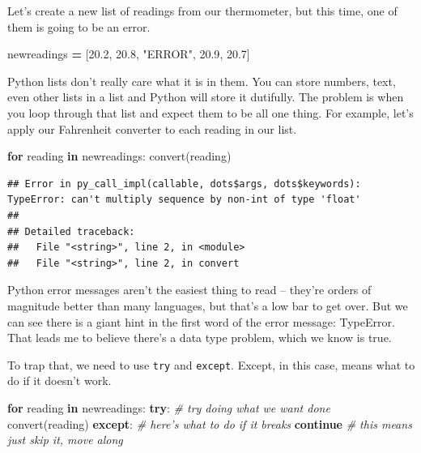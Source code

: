 \documentclass[
]{book}
\newenvironment{Shaded}{\begin{snugshade}}{\end{snugshade}}
\newcommand{\CommentTok}[1]{\textcolor[rgb]{0.56,0.35,0.01}{\textit{#1}}}
\newcommand{\ControlFlowTok}[1]{\textcolor[rgb]{0.13,0.29,0.53}{\textbf{#1}}}
\newcommand{\FloatTok}[1]{\textcolor[rgb]{0.00,0.00,0.81}{#1}}
\newcommand{\KeywordTok}[1]{\textcolor[rgb]{0.13,0.29,0.53}{\textbf{#1}}}
\newcommand{\NormalTok}[1]{#1}
\newcommand{\OperatorTok}[1]{\textcolor[rgb]{0.81,0.36,0.00}{\textbf{#1}}}
\newcommand{\StringTok}[1]{\textcolor[rgb]{0.31,0.60,0.02}{#1}}
\begin{document}
Let's create a new list of readings from our thermometer, but this time, one of them is going to be an error.

\begin{Shaded}
\begin{Highlighting}[]
\NormalTok{newreadings }\OperatorTok{=}\NormalTok{ [}\FloatTok{20.2}\NormalTok{, }\FloatTok{20.8}\NormalTok{, }\StringTok{"ERROR"}\NormalTok{, }\FloatTok{20.9}\NormalTok{, }\FloatTok{20.7}\NormalTok{] }
\end{Highlighting}
\end{Shaded}

Python lists don't really care what it is in them. You can store numbers, text, even other lists in a list and Python will store it dutifully. The problem is when you loop through that list and expect them to be all one thing. For example, let's apply our Fahrenheit converter to each reading in our list.

\begin{Shaded}
\begin{Highlighting}[]
\ControlFlowTok{for}\NormalTok{ reading }\KeywordTok{in}\NormalTok{ newreadings:}
\NormalTok{    convert(reading)}
\end{Highlighting}
\end{Shaded}

\begin{verbatim}
## Error in py_call_impl(callable, dots$args, dots$keywords): TypeError: can't multiply sequence by non-int of type 'float'
## 
## Detailed traceback: 
##   File "<string>", line 2, in <module>
##   File "<string>", line 2, in convert
\end{verbatim}

Python error messages aren't the easiest thing to read -- they're orders of magnitude better than many languages, but that's a low bar to get over. But we can see there is a giant hint in the first word of the error message: TypeError. That leads me to believe there's a data type problem, which we know is true.

To trap that, we need to use \texttt{try} and \texttt{except}. Except, in this case, means what to do if it doesn't work.

\begin{Shaded}
\begin{Highlighting}[]
\ControlFlowTok{for}\NormalTok{ reading }\KeywordTok{in}\NormalTok{ newreadings:}
    \ControlFlowTok{try}\NormalTok{: }\CommentTok{# try doing what we want done}
\NormalTok{        convert(reading)}
    \ControlFlowTok{except}\NormalTok{: }\CommentTok{# here's what to do if it breaks}
        \ControlFlowTok{continue} \CommentTok{# this means just skip it, move along}
\end{Highlighting}
\end{Shaded}
\end{document}
